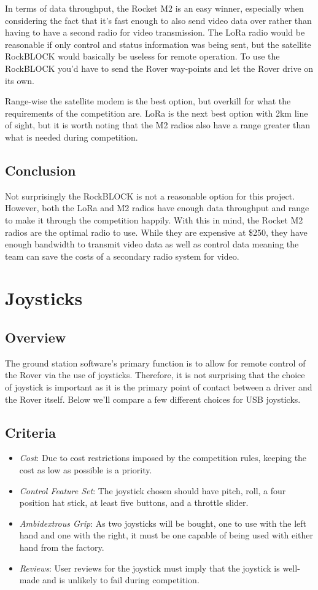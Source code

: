 \documentclass[onecolumn, draftclsnofoot, 10pt, compsoc]{IEEEtran}
\begin{document}
In terms of data throughput, the Rocket M2 is an easy winner, especially when considering the fact that it's fast enough to also send video data over rather than having to have a second radio for video transmission. The LoRa radio would be reasonable if only control and status information was being sent, but the satellite RockBLOCK would basically be useless for remote operation. To use the RockBLOCK you'd have to send the Rover way-points and let the Rover drive on its own.

Range-wise the satellite modem is the best option, but overkill for what the requirements of the competition are. LoRa is the next best option with 2km line of sight, but it is worth noting that the M2 radios also have a range greater than what is needed during competition.

\subsection{Conclusion}
Not surprisingly the RockBLOCK is not a reasonable option for this project. However, both the LoRa and M2 radios have enough data throughput and range to make it through the competition happily. With this in mind, the Rocket M2 radios are the optimal radio to use. While they are expensive at \$250, they have enough bandwidth to transmit video data as well as control data meaning the team can save the costs of a secondary radio system for video.

\section{Joysticks}
\subsection{Overview}
The ground station software's primary function is to allow for remote control of the Rover via the use of joysticks. Therefore, it is not surprising that the choice of joystick is important as it is the primary point of contact between a driver and the Rover itself. Below we'll compare a few different choices for USB joysticks.

\subsection{Criteria}
\begin{itemize}
\item \textit{Cost}: Due to cost restrictions imposed by the competition rules, keeping the cost as low as possible is a priority.
\item \textit{Control Feature Set}: The joystick chosen should have pitch, roll, a four position hat stick, at least five buttons, and a throttle slider.
\item \textit{Ambidextrous Grip}: As two joysticks will be bought, one to use with the left hand and one with the right, it must be one capable of being used with either hand from the factory.
\item \textit{Reviews}: User reviews for the joystick must imply that the joystick is well-made and is unlikely to fail during competition.
\end{itemize}
\end{document}
